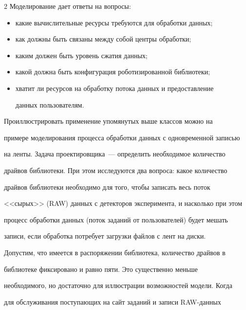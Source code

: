 \begin{multicols}{2}
   Моделирование дает ответы на вопросы:


   \begin{itemize}


   \item какие вычислительные ресурсы требуются для обработки данных;


   \item как должны быть связаны между собой центры обработки;


   \item каким должен быть уровень сжатия данных;


   \item какой должна быть конфигурация роботизированной библиотеки;


   \item хватит ли ресурсов на обработку потока данных и предоставление 


данных пользователям. 


   \end{itemize}


   


   Проиллюстрировать применение упомянутых выше классов можно на 


примере моделирования процесса обработки данных с одновременной \mbox{записью} 


на ленты. Задача проектировщика~--- определить необходимое количество 


драйвов библиотеки. При этом исследуются два вопроса: какое количество 


драйвов библиотеки необходимо для того, чтобы записать весь поток 


<<сырых>> (RAW) данных с детекторов эксперимента, и насколько при этом 


процесс обработки данных (поток заданий от пользователей) будет мешать 


записи, если обработка потребует загрузки файлов с лент на диски.


   


   Допустим, что имеется в распоряжении биб\-ли\-о\-тека, количество драйвов в 


библиотеке фик\-си\-ровано и равно пяти. Это существенно меньше 


необходимого, но достаточно для иллюстрации возмож\-но\-стей модели. Когда 


для обслуживания поступающих на сайт заданий и записи RAW-дан\-ных 



\end{multicols}
